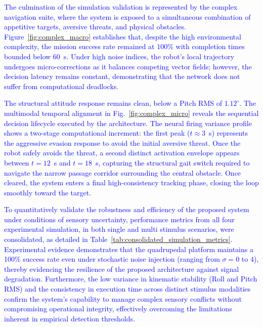 \documentclass[preprint,12pt]{elsarticle}
\newcommand{\revblue}[1]{\textcolor{blue}{#1}}
\begin{document}
\revblue{The culmination of the simulation validation is represented by the complex navigation suite, where the system is exposed to a simultaneous combination of appetitive targets, aversive threats, and physical obstacles. Figure~\ref{fig:complex_macro} establishes that, despite the high environmental complexity, the mission success rate remained at $100\%$ with completion times bounded below $60$~s. Under high noise indices, the robot's local trajectory undergoes micro-corrections as it balances competing vector fields; however, the decision latency remains constant, demonstrating that the network does not suffer from computational deadlocks.}

\revblue{The structural attitude response remains clean, below a Pitch RMS of $1.12^\circ$. The multimodal temporal alignment in Fig.~\ref{fig:complex_micro} reveals the sequential decision lifecycle executed by the architecture. The neural firing variance profile shows a two-stage computational increment: the first peak ($t \approx 3$~s) represents the aggressive evasion response to avoid the initial aversive threat. Once the robot safely avoids the threat, a second distinct activation envelope appears between $t = 12$~s and $t = 18$~s, capturing the structural gait switch required to navigate the narrow passage corridor surrounding the central obstacle. Once cleared, the system enters a final high-consistency tracking phase, closing the loop smoothly toward the target.}

\revblue{To quantitatively validate the robustness and efficiency of the proposed system under conditions of sensory uncertainty, performance metrics from all four experimental simulation, in both single and multi stimulus scenarios, were consolidated, as detailed in Table~\ref{tab:consolidated_simulation_metrics}. Experimental evidence demonstrates that the quadrupedal platform maintains a 100\% success rate even under stochastic noise injection (ranging from $\sigma = 0$ to $4$), thereby evidencing the resilience of the proposed architecture against signal degradation. Furthermore, the low variance in kinematic stability (Roll and Pitch RMS) and the consistency in execution time across distinct stimulus modalities confirm the system's capability to manage complex sensory conflicts without compromising operational integrity, effectively overcoming the limitations inherent in empirical detection thresholds.}
\end{document}
